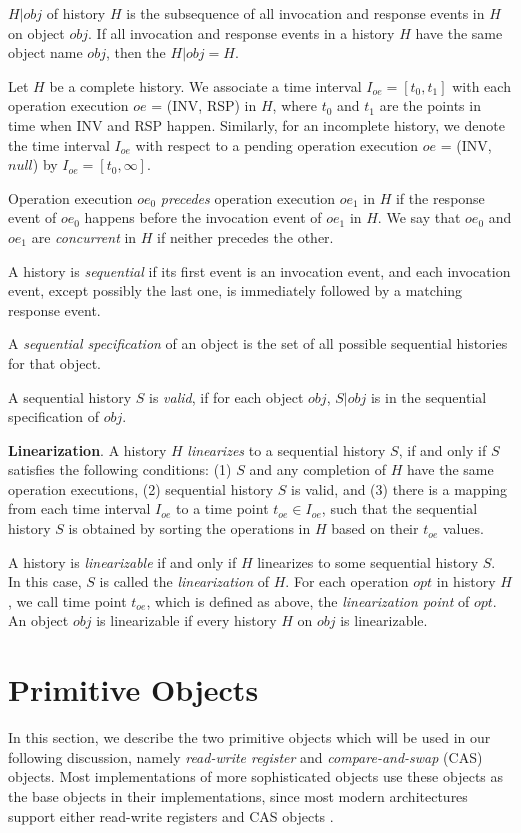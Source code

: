 $H|obj$ of history $H$ is the subsequence of all
invocation and response events in $H$ on object $obj$. If all invocation and response
events in a history $H$ have the same object name $obj$, then the $H|obj = H$.

Let $H$ be a complete history. We associate a time interval $I_{oe} = [t_0, t_1]$ with each
operation execution $oe$ = (INV, RSP) in $H$, where $t_0$ and $t_1$ are the points in time when INV and RSP happen.
Similarly, for an incomplete history, we denote the time interval $I_{oe}$ with respect to a pending
operation execution $oe$ = (INV, $null$) by $I_{oe} = [t_0, \infty]$.

Operation execution $oe_0$ \emph{precedes} operation execution $oe_1$ in $H$ if the response event of
$oe_0$ happens before the invocation event of $oe_1$ in $H$.
We say that $oe_0$ and $oe_1$ are \emph{concurrent} in $H$ if neither precedes the other.

A history is \emph{sequential} if its first event is an invocation event, and each invocation event, except
possibly the last one, is immediately followed by a matching response event.

A \emph{sequential specification} of an object is the set of all possible sequential histories
for that object.

A sequential history $S$ is \emph{valid}, if for each object $obj$, $S|obj$ is
in the sequential specification of $obj$.

\textbf{Linearization}.
A history $H$ \emph{linearizes} to a sequential history $S$, if and only if $S$ satisfies the
following conditions: (1) $S$ and any completion of $H$ have the same operation executions, (2) sequential history $S$ is
valid, and (3) there is a mapping from each time interval $I_{oe}$ to a time point $t_{oe} \in I_{oe}$, such
that the sequential history $S$ is obtained by sorting the operations in $H$ based on their $t_{oe}$ values.

A history is \emph{linearizable} if and only if $H$ linearizes to some sequential history $S$. In this case,
$S$ is called the \emph{linearization} of $H$. For each operation $opt$ in history $H$, we call time point $t_{oe}$, which is
defined as above, the \emph{linearization point} of $opt$. An object $obj$ is linearizable if every
history $H$ on $obj$ is linearizable.

\section{Primitive Objects}
In this section, we describe the two primitive objects which will be used in our following discussion,
namely \emph{read-write register} and \emph{compare-and-swap} (CAS) objects. Most implementations
of more sophisticated objects use these objects as the base objects in their implementations,
since most modern architectures support either read-write registers and CAS objects \cite{itanium} \cite{weaver1994sparc}.

